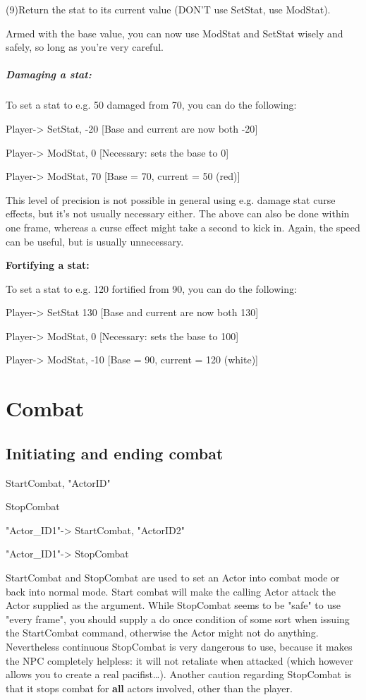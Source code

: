 (9)Return the stat to its current value (DON'T use SetStat, use
ModStat).

Armed with the base value, you can now use ModStat and SetStat wisely
and safely, so long as you're very careful.

\hypertarget{damaging-a-stat}{%
\subparagraph{Damaging a stat:}\label{damaging-a-stat}}

To set a stat to e.g. 50 damaged from 70, you can do the following:

Player-> SetStat, -20 {[}Base and current are now both -20{]}

Player-> ModStat, 0 {[}Necessary: sets the base to 0{]}

Player-> ModStat, 70 {[}Base = 70, current = 50 (red){]}

This level of precision is not possible in general using e.g. damage
stat curse effects, but it's not usually necessary either. The above can
also be done within one frame, whereas a curse effect might take a
second to kick in. Again, the speed can be useful, but is usually
unnecessary.

\textbf{Fortifying a stat:}

To set a stat to e.g. 120 fortified from 90, you can do the following:

Player-> SetStat 130 {[}Base and current are now both 130{]}

Player-> ModStat, 0 {[}Necessary: sets the base to 100{]}

Player-> ModStat, -10 {[}Base = 90, current = 120 (white){]}

\hypertarget{combat}{%
\section{Combat}\label{combat}}

\hypertarget{initiating-and-ending-combat}{%
\subsection{Initiating and ending
combat}\label{initiating-and-ending-combat}}

StartCombat, "ActorID"

StopCombat

"Actor\_ID1"-> StartCombat, "ActorID2"

"Actor\_ID1"-> StopCombat

StartCombat and StopCombat are used to set an Actor into combat mode or
back into normal mode. Start combat will make the calling Actor attack
the Actor supplied as the argument. While StopCombat seems to be "safe"
to use "every frame", you should supply a do once condition of some sort
when issuing the StartCombat command, otherwise the Actor might not do
anything. Nevertheless continuous StopCombat is very dangerous to use,
because it makes the NPC completely helpless: it will not retaliate when
attacked (which however allows you to create a real pacifist\ldots).
Another caution regarding StopCombat is that it stops combat for
\textbf{all} actors involved, other than the player.

